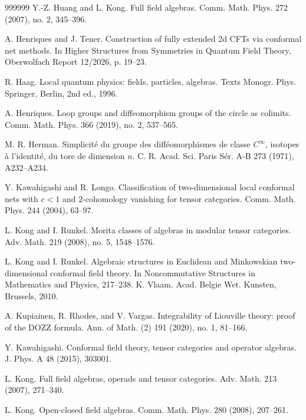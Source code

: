 \documentclass[11pt,b5paper,notitlepage]{article}
\theoremstyle{definition}
\theoremstyle{plain}
\numberwithin{equation}{section}
\begin{document}
\begin{thebibliography}{999999}
Y.-Z. Huang and L. Kong.
Full field algebras.
Comm. Math. Phys. 272 (2007), no. 2, 345--396.

A. Henriques and J. Tener.
Construction of fully extended 2d CFTs via conformal net methods.
In Higher Structures from Symmetries in Quantum Field Theory, Oberwolfach Report 12/2026, p. 19--23.




R. Haag.
Local quantum physics: fields, particles, algebras.
Texts Monogr. Phys.
Springer, Berlin, 2nd ed., 1996.



A. Henriques. Loop groups and diffeomorphism groups of the circle as colimits. Comm. Math. Phys. 366 (2019), no. 2, 537--565.

M. R. Herman.
Simplicit\'e du groupe des diff\'eomorphismes de classe $C^\infty$, isotopes \`a l'identit\'e, du tore de dimension $n$.
C. R. Acad. Sci. Paris S\'er. A-B 273 (1971), A232--A234.

Y. Kawahigashi and R. Longo.
Classification of two-dimensional local conformal nets with $c<1$ and $2$-cohomology vanishing for tensor categories.
Comm. Math. Phys. 244 (2004), 63--97.


L. Kong and I. Runkel.
Morita classes of algebras in modular tensor categories.
Adv. Math. 219 (2008), no. 5, 1548--1576.



L. Kong and I. Runkel.
Algebraic structures in Euclidean and Minkowskian two-dimensional conformal field theory.
In Noncommutative Structures in Mathematics and Physics, 217--238.
K. Vlaam. Acad. Belgie Wet. Kunsten, Brussels, 2010.

A. Kupiainen, R. Rhodes, and V. Vargas.
Integrability of Liouville theory: proof of the DOZZ formula.
Ann. of Math. (2) 191 (2020), no. 1, 81--166.


Y. Kawahigashi.
Conformal field theory, tensor categories and operator algebras.
J. Phys. A 48 (2015), 303001.


L. Kong.
Full field algebras, operads and tensor categories.
Adv. Math. 213 (2007), 271--340.


L. Kong.
Open-closed field algebras.
Comm. Math. Phys. 280 (2008), 207--261.





\end{thebibliography}
\end{document}
